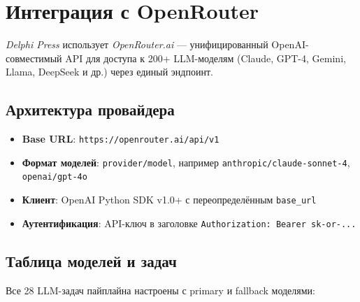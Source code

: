 
\section{Интеграция с OpenRouter}

\label{sec:openrouter}


\emph{Delphi Press} использует \emph{OpenRouter.ai} — унифицированный OpenAI-совместимый API для доступа к 200+ LLM-моделям (Claude, GPT-4, Gemini, Llama, DeepSeek и др.) через единый эндпоинт.

\subsection{Архитектура провайдера}

\begin{itemize}[nosep]
\item \textbf{Base URL}: \texttt{https://openrouter.ai/api/v1}
\item \textbf{Формат моделей}: \texttt{provider/model}, например \texttt{anthropic/claude-sonnet-4}, \texttt{openai/gpt-4o}
\item \textbf{Клиент}: OpenAI Python SDK v1.0+ с переопределённым \texttt{base\_url}
\item \textbf{Аутентификация}: API-ключ в заголовке \texttt{Authorization: Bearer sk-or-...}
\end{itemize}

\subsection{Таблица моделей и задач}


Все 28 LLM-задач пайплайна настроены с primary и fallback моделями:

